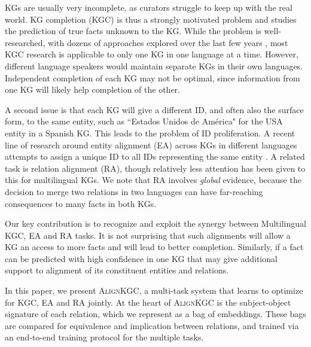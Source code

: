 \documentclass[11pt]{article}
\def\shortname{\textsc{Align\-KGC}}
\begin{document}
KGs are usually very incomplete, as curators struggle to keep up with the real world.  KG completion (KGC) is thus a strongly motivated problem and studies the prediction of true facts unknown to the KG.  While the problem is well-researched, with dozens of approaches explored over the last few years \citep{bordes2013transe, dettmers2018conve, sun2019rotate, trouillon2016complex}, most KGC research is applicable to only one KG in one language at a time. However, different language speakers would maintain separate KGs in their own languages.  Independent completion of each KG may not be optimal, since information from one KG will likely help completion of the other. 

A second issue is that each KG will give a different ID, and often also the surface form, to the same entity, such as ``Estados Unidos de América" for the USA entity in a Spanish KG. This leads to the problem of ID proliferation. A recent line of research around entity alignment (EA) across KGs  in different languages attempts to assign a unique ID to all IDs representing the same entity \citep{Chen+2017MtransE, Sun+2017JAPE, Sun+2018BootEA, cao-etal-2019-multi, Sun+2020AliNet, chen+2021jeans, Tang+2020BertInt}. A related task is relation alignment (RA), though relatively less attention has been given to this for multilingual KGs. We note that RA involves \emph{global} evidence, because the decision to merge two relations in two languages can have far-reaching consequences to many facts in both KGs.

Our key contribution is to recognize and exploit the synergy between Multilingual KGC, EA and RA tasks. It is not surprising that such alignments will allow a KG an access to more facts and will lead to better completion. Similarly, if a fact can be predicted with high confidence in one KG that may give additional support to alignment of its constituent entities and relations. 




















In this paper, we present \shortname, a multi-task system that learns to optimize for KGC, EA and RA jointly.  At the heart of \shortname{} is the subject-object signature of each relation, which we represent as a bag of embeddings.  These bags are compared for equivalence and implication between relations, and trained via an end-to-end training protocol for the multiple tasks.
\end{document}
